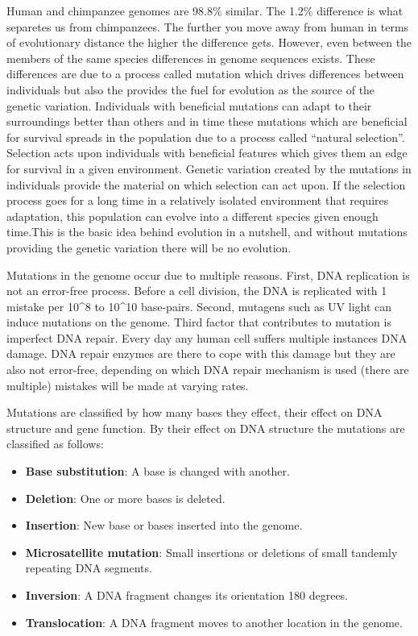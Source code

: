\documentclass[12pt,]{krantz}
\providecommand{\tightlist}{%
  \setlength{\itemsep}{0pt}\setlength{\parskip}{0pt}}
\theoremstyle{definition}
\theoremstyle{definition}
\theoremstyle{definition}
\theoremstyle{remark}
\begin{document}
Human and chimpanzee genomes are 98.8\% similar. The 1.2\% difference is
what separetes us from chimpanzees. The further you move away from human
in terms of evolutionary distance the higher the difference gets.
However, even between the members of the same species differences in
genome sequences exists. These differences are due to a process called
mutation which drives differences between individuals but also the
provides the fuel for evolution as the source of the genetic variation.
Individuals with beneficial mutations can adapt to their surroundings
better than others and in time these mutations which are beneficial for
survival spreads in the population due to a process called ``natural
selection''. Selection acts upon individuals with beneficial features
which gives them an edge for survival in a given environment. Genetic
variation created by the mutations in individuals provide the material
on which selection can act upon. If the selection process goes for a
long time in a relatively isolated environment that requires adaptation,
this population can evolve into a different species given enough
time.This is the basic idea behind evolution in a nutshell, and without
mutations providing the genetic variation there will be no evolution.

Mutations in the genome occur due to multiple reasons. First, DNA
replication is not an error-free process. Before a cell division, the
DNA is replicated with 1 mistake per 10\^{}8 to 10\^{}10 base-pairs.
Second, mutagens such as UV light can induce mutations on the genome.
Third factor that contributes to mutation is imperfect DNA repair. Every
day any human cell suffers multiple instances DNA damage. DNA repair
enzymes are there to cope with this damage but they are also not
error-free, depending on which DNA repair mechanism is used (there are
multiple) mistakes will be made at varying rates.

Mutations are classified by how many bases they effect, their effect on
DNA structure and gene function. By their effect on DNA structure the
mutations are classified as follows:

\begin{itemize}
\tightlist
\item
  \textbf{Base substitution}: A base is changed with another.
\item
  \textbf{Deletion}: One or more bases is deleted.
\item
  \textbf{Insertion}: New base or bases inserted into the genome.
\item
  \textbf{Microsatellite mutation}: Small insertions or deletions of
  small tandemly repeating DNA segments.
\item
  \textbf{Inversion}: A DNA fragment changes its orientation 180
  degrees.
\item
  \textbf{Translocation}: A DNA fragment moves to another location in
  the genome.
\end{itemize}
\end{document}

